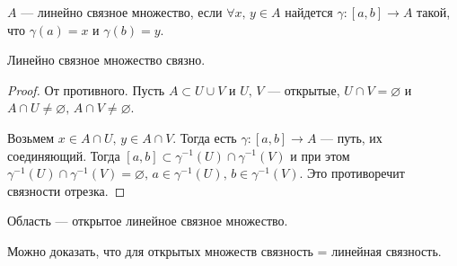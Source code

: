 \begin{conj}
  $A$ --- линейно связное множество, если $\forall x,\, y \in A$ найдется
  $\gamma\colon [a, b] \to A$ такой, что $\gamma(a) = x$ и $\gamma(b) = y$.
\end{conj}

\begin{theorem}
  Линейно связное множество связно.
\end{theorem} \nopagebreak[4]
\begin{proof}
  От противного. Пусть $A \subset U \cup V$ и $U,\, V$ --- открытые, $U \cap V = \varnothing$ и $A \cap U \neq \varnothing, \, A \cap V \neq \varnothing$.

  Возьмем $x \in A \cap U, \, y \in A \cap V$. Тогда есть $\gamma\colon [a, b] \to A$ --- путь, их соединяющий. Тогда $[a, b] \subset \gamma^{-1}(U) \cap \gamma^{-1}(V)$ и при этом~$\gamma^{-1}(U) \cap \gamma^{-1}(V) = \varnothing, \, a \in \gamma^{-1}(U), \, b \in \gamma^{-1}(V)$. Это противоречит связности отрезка.
\end{proof}

\begin{conj}
  Область --- открытое линейное связное множество.
\end{conj}

\begin{notice}
  Можно доказать, что для открытых множеств связность = линейная связность.
\end{notice}

